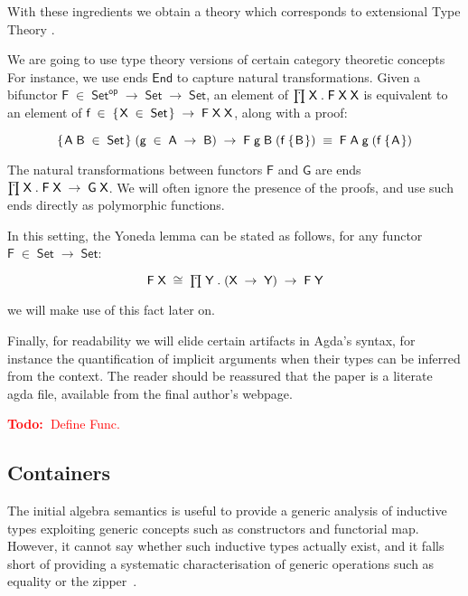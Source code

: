 \documentclass[a4paper]{article}
\newcommand{\todo}[1]{\textcolor{red}{\textbf{Todo:~}#1}}
\newcommand{\Conid}[1]{\mathit{#1}}
\newcommand{\Varid}[1]{\mathit{#1}}
\renewcommand\Varid[1]{\mathord{\textsf{#1}}}
\let\Conid\Varid
\begin{document}
With these ingredients we obtain a theory which corresponds to
extensional Type Theory \cite{hofmann-conservativity}.

We are going to use type theory versions of certain category theoretic
concepts For instance, we use ends \ensuremath{\Conid{End}} to capture natural transformations.
Given a bifunctor \ensuremath{\Conid{F}\;\in\;\Conid{Set}^{\Varid{op}}\;\rightarrow\;\Conid{Set}\;\rightarrow\;\Conid{Set}}, an element of \ensuremath{\prodd\;\Conid{X}\;.\;\Conid{F}\;\Conid{X}\;\Conid{X}} is
equivalent to an element of \ensuremath{\Varid{f}\;\in\;\{\mskip1.5mu \Conid{X}\;\in\;\Conid{Set}\mskip1.5mu\}\;\rightarrow\;\Conid{F}\;\Conid{X}\;\Conid{X}}, along with a proof:

\[ \mbox{\ensuremath{\{\mskip1.5mu \Conid{A}\;\Conid{B}\;\in\;\Conid{Set}\mskip1.5mu\}\;(\Varid{g}\;\in\;\Conid{A}\;\rightarrow\;\Conid{B})\;\rightarrow\;\Conid{F}\;\Varid{g}\;\Conid{B}\;(\Varid{f}\;\{\mskip1.5mu \Conid{B}\mskip1.5mu\})\;\equiv\;\Conid{F}\;\Conid{A}\;\Varid{g}\;(\Varid{f}\;\{\mskip1.5mu \Conid{A}\mskip1.5mu\})}} \]


\noindent
The natural transformations between functors \ensuremath{\Conid{F}} and \ensuremath{\Conid{G}} are ends \ensuremath{\prodd\;\Conid{X}\;.\;\Conid{F}\;\Conid{X}\;\rightarrow\;\Conid{G}\;\Conid{X}}. We will often ignore the presence of the proofs, and 
use such ends directly as polymorphic functions.

In this setting, the Yoneda lemma can be stated as follows, for any functor \ensuremath{\Conid{F}\;\in\;\Conid{Set}\;\rightarrow\;\Conid{Set}}:

\[\mbox{\ensuremath{\Conid{F}\;\Conid{X}\;\cong\;\prodd\;\Conid{Y}\;.\;(\Conid{X}\;\rightarrow\;\Conid{Y})\;\rightarrow\;\Conid{F}\;\Conid{Y}}}\]

we will make use of this fact later on.

Finally, for readability we will elide certain artifacts in Agda's syntax,
for instance the quantification of implicit arguments when their types can be
inferred from the context. The reader should be reassured that the paper is a
literate agda file, available from the final author's webpage.

\todo{Define Func.}
 
\subsection{Containers}


The initial algebra semantics is useful to provide a generic
analysis of inductive types exploiting generic concepts such as
constructors and functorial map. However, it cannot say whether such inductive
types actually exist, and it falls short of providing a systematic
characterisation of generic operations such as equality or the
zipper~\cite{huet:zipper,conor:derivative}. 
\end{document}
